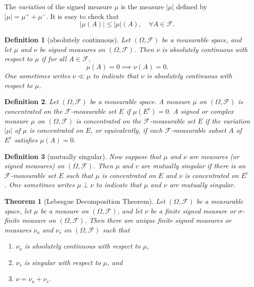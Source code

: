 \documentclass{report}
\newtheorem{definition}{Definition}[section]
\newtheorem{theorem}{Theorem}[section]
\theoremstyle{nonumberplain}
\begin{document}
The \emph{variation} of the signed measure $\mu$ is the measure $|\mu|$ defined by $|\mu|=\mu^{+}+\mu^{-}$. It is easy to check that
\[
|\mu(A)| \leq|\mu|(A),\quad\forall A\in\mathcal{F}.
\]

\begin{definition}[absolutely continuous]
Let $(\Omega, \mathcal{F})$ be a measurable space, and let $\mu$ and $\nu$ be signed measures on $(\Omega, \mathcal{F})$. Then $\nu$ is \emph{absolutely continuous} with respect to $\mu$ if for all $A\in\mathcal{F}$,
\[
\mu(A)=0\implies \nu(A)=0.
\]
One sometimes writes $\nu \ll \mu$ to indicate that $\nu$ is absolutely continuous with respect to $\mu$.
\end{definition}

\begin{definition}
	Let $(\Omega, \mathcal{F})$ be a measurable space. A measure $\mu$ on $(\Omega, \mathcal{F})$ is \emph{concentrated} on the $\mathcal{F}$-measurable set $E$ if $\mu\left(E^{c}\right)=0 .$ A signed or complex measure $\mu$ on $(\Omega, \mathcal{F})$ is concentrated on the $\mathcal{F}$-measurable set $E$ if the variation $|\mu|$ of $\mu$ is concentrated on $E$, or equivalently, if each $\mathcal{F}$-measurable subset $A$ of $E^{c}$ satisfies $\mu(A)=0$.
\end{definition}

\begin{definition}[mutually singular]
 Now suppose that $\mu$ and $\nu$ are measures (or signed measures) on $(\Omega, \mathcal{F})$. Then $\mu$ and $v$ are \emph{mutually singular} if there is an $\mathcal{F}$-measurable set $E$ such that $\mu$ is concentrated on $E$ and $\nu$ is concentrated on $E^{c}$. One sometimes writes $\mu \perp \nu$ to indicate that $\mu$ and $\nu$ are mutually singular.
\end{definition}

\begin{theorem}[Lebesgue Decomposition Theorem]
	Let $(\Omega, \mathcal{F})$ be a measurable space, let $\mu$ be a measure on $(\Omega, \mathcal{F})$, and let $\nu$ be a finite signed measure or $\sigma$-finite measure on $(\Omega, \mathcal{F})$. Then there are unique finite signed measures or measures $\nu_{a}$ and $\nu_{s}$ on $(\Omega, \mathcal{F})$ such that
\begin{enumerate}[label=(\alph*)]
	\item $\nu_{a}$ is absolutely continuous with respect to $\mu$,
	\item $\nu_{s}$ is singular with respect to $\mu$, and
	\item $\nu=\nu_{a}+\nu_{s}$.
\end{enumerate}

\end{theorem}
\end{document}
